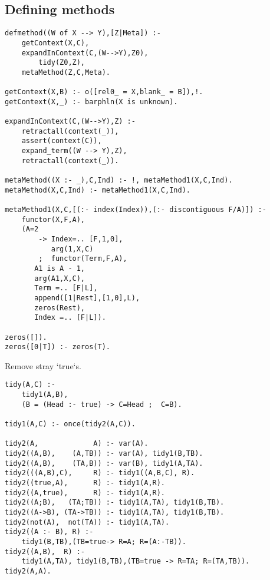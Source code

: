 \documentclass[twocolumn,10pt]{book}
\begin{document}
\subsection{ Defining methods }\begin{Verbatim}
defmethod((W of X --> Y),[Z|Meta]) :-
    getContext(X,C),
    expandInContext(C,(W-->Y),Z0),
        tidy(Z0,Z),
    metaMethod(Z,C,Meta).

getContext(X,B) :- o([rel0_ = X,blank_ = B]),!.
getContext(X,_) :- barphln(X is unknown).

expandInContext(C,(W-->Y),Z) :-
    retractall(context(_)),
    assert(context(C)),
    expand_term((W --> Y),Z),
    retractall(context(_)).

metaMethod((X :- _),C,Ind) :- !, metaMethod1(X,C,Ind).
metaMethod(X,C,Ind) :- metaMethod1(X,C,Ind).

metaMethod1(X,C,[(:- index(Index)),(:- discontiguous F/A)]) :-
    functor(X,F,A),
    (A=2
        -> Index=.. [F,1,0],
           arg(1,X,C)
        ;  functor(Term,F,A),
       A1 is A - 1,
       arg(A1,X,C),
       Term =.. [F|L],
       append([1|Rest],[1,0],L),
       zeros(Rest),
       Index =.. [F|L]).

zeros([]).
zeros([0|T]) :- zeros(T).
\end{Verbatim}
 Remove stray `true`s.  \begin{Verbatim}
tidy(A,C) :-
    tidy1(A,B),
    (B = (Head :- true) -> C=Head ;  C=B).

tidy1(A,C) :- once(tidy2(A,C)).

tidy2(A,             A) :- var(A).
tidy2((A,B),    (A,TB)) :- var(A), tidy1(B,TB).
tidy2((A,B),    (TA,B)) :- var(B), tidy1(A,TA).
tidy2(((A,B),C),     R) :- tidy1((A,B,C), R).
tidy2((true,A),      R) :- tidy1(A,R).
tidy2((A,true),      R) :- tidy1(A,R).
tidy2((A;B),   (TA;TB)) :- tidy1(A,TA), tidy1(B,TB).
tidy2((A->B), (TA->TB)) :- tidy1(A,TA), tidy1(B,TB).
tidy2(not(A),  not(TA)) :- tidy1(A,TA).
tidy2((A :- B), R) :-
    tidy1(B,TB),(TB=true-> R=A; R=(A:-TB)).
tidy2((A,B),  R) :-
    tidy1(A,TA), tidy1(B,TB),(TB=true -> R=TA; R=(TA,TB)).
tidy2(A,A).
\end{Verbatim}
\end{document}
